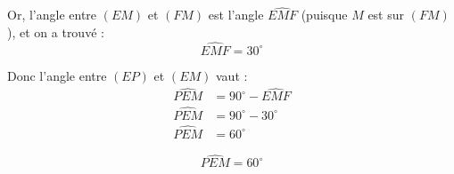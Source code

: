 \documentclass[answers]{exam}
\begin{document}
\begin{solution}
\begin{parts}
Or, l'angle entre $(EM)$ et $(FM)$ est l'angle $\widehat{EMF}$ (puisque $M$ est sur $(FM)$), et on a trouvé :
\[
\widehat{EMF} = 30^\circ
\]

Donc l'angle entre $(EP)$ et $(EM)$ vaut :
\begin{align*}
\widehat{PEM} &= 90^\circ - \widehat{EMF} \\
\widehat{PEM} &= 90^\circ - 30^\circ \\
\widehat{PEM} &= 60^\circ
\end{align*}

\[
\boxed{\widehat{PEM} = 60^\circ}
\]

\end{parts}
\end{solution}
\end{document}
